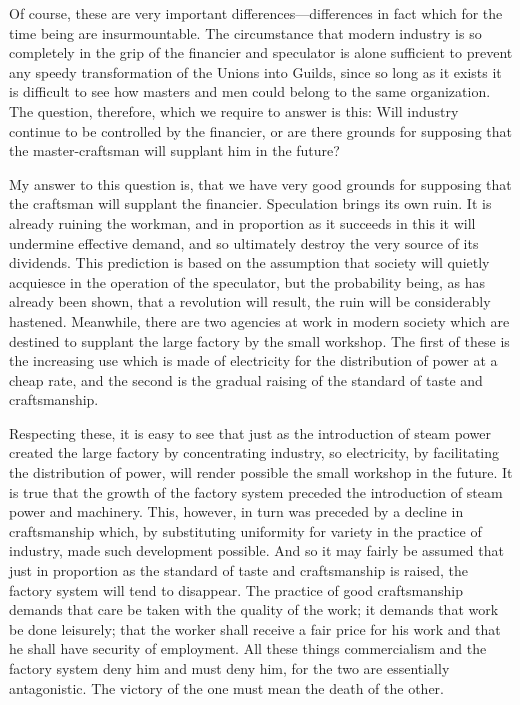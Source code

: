 \documentclass{book}
\begin{document}
Of course, these are very important differences—differences in fact which for the time being are insurmountable. The circumstance that modern industry is so completely in the grip of the financier and speculator is alone sufficient to prevent any speedy transformation of the Unions into Guilds, since so long as it exists it is difficult to see how masters and men could belong to the same organization. The question, therefore, which we require to answer is this: Will industry continue to be controlled by the financier, or are there grounds for supposing that the master-craftsman will supplant him in the future?

My answer to this question is, that we have very good grounds for supposing that the craftsman will supplant the financier. Speculation brings its own ruin. It is already ruining the workman, and in proportion as it succeeds in this it will undermine effective demand, and so ultimately destroy the very source of its dividends. This prediction is based on the assumption that society will quietly acquiesce in the operation of the speculator, but the probability being, as has already been shown, that a revolution will result, the ruin will be considerably hastened. Meanwhile, there are two agencies at work in modern society which are destined to supplant the large factory by the small workshop. The first of these is the increasing use which is made of electricity for the distribution of power at a cheap rate, and the second is the gradual raising of the standard of taste and craftsmanship.

Respecting these, it is easy to see that just as the introduction of steam power created the large factory by concentrating industry, so electricity, by facilitating the distribution of power, will render possible the small workshop in the future. It is true that the growth of the factory system preceded the introduction of steam power and machinery. This, however, in turn was preceded by a decline in craftsmanship which, by substituting uniformity for variety in the practice of industry, made such development possible. And so it may fairly be assumed that just in proportion as the standard of taste and craftsmanship is raised, the factory system will tend to disappear. The practice of good craftsmanship demands that care be taken with the quality of the work; it demands that work be done leisurely; that the worker shall receive a fair price for his work and that he shall have security of employment. All these things commercialism and the factory system deny him and must deny him, for the two are essentially antagonistic. The victory of the one must mean the death of the other.\footnotemark[1]
\end{document}
